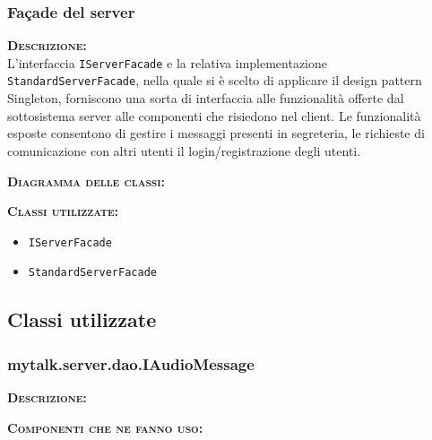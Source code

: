 \subsubsection{Façade del server}
\begin{description}
	\item{\scshape\bfseries Descrizione:}\\
L'interfaccia \texttt{IServerFacade} e la relativa implementazione \texttt{StandardServerFacade}, nella quale si è scelto di applicare il design pattern Singleton, forniscono una sorta di interfaccia alle funzionalità offerte dal sottosistema server alle componenti che risiedono nel client. Le funzionalità esposte consentono di gestire i messaggi presenti in segreteria, le richieste di comunicazione con altri utenti il login/registrazione degli utenti.
	\item{\scshape\bfseries Diagramma delle classi:}
	\item{\scshape\bfseries Classi utilizzate:}\\
\begin{itemize}
  \item \texttt{IServerFacade}
  \item \texttt{StandardServerFacade}
\end{itemize}
\end{description}

\subsection{Classi utilizzate}


\subsubsection{mytalk.server.dao.IAudioMessage}
\begin{description}
	\item{\scshape\bfseries Descrizione:} 
	\item{\scshape\bfseries Componenti che ne fanno uso:} 
\end{description}

